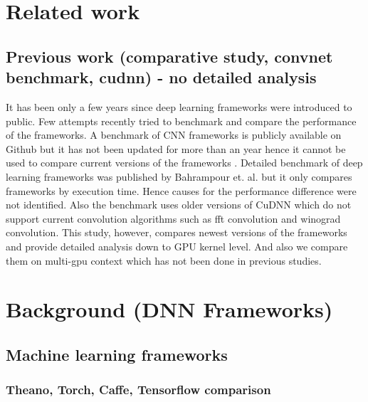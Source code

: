 \documentclass[conference]{IEEEtran}
\begin{document}
\section{Related work}

\subsection{Previous work (comparative study, convnet benchmark, cudnn) - no detailed analysis}
It has been only a few years since deep learning frameworks were introduced to public.
Few attempts recently tried to benchmark and compare the performance of the frameworks.
A benchmark of CNN frameworks is publicly available on Github but it has not been updated for more than an year hence it cannot be used to compare current versions of the frameworks \cite{}.
Detailed benchmark of deep learning frameworks was published by Bahrampour et. al. but it only compares frameworks by execution time.
Hence causes for the performance difference were not identified.
Also the benchmark uses older versions of CuDNN which do not support current convolution algorithms such as fft convolution and winograd convolution.
This study, however, compares newest versions of the frameworks and provide detailed analysis down to GPU kernel level.
And also we compare them on multi-gpu context which has not been done in previous studies.


\section{Background (DNN Frameworks)}

\subsection{Machine learning frameworks}

\subsubsection{Theano, Torch, Caffe, Tensorflow comparison}
\end{document}

